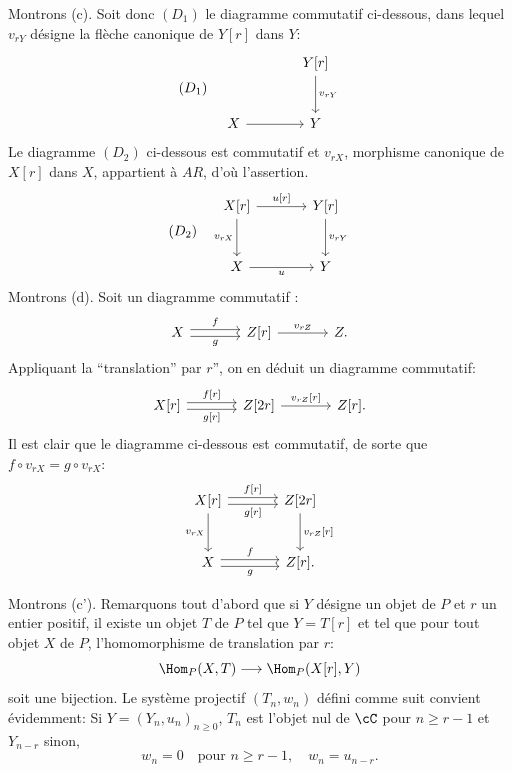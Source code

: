 Montrons (c). Soit donc $(D_1)$ le diagramme commutatif ci-dessous, dans lequel $v_{rY}$ désigne la flèche canonique de $Y[r]$ dans $Y$:
\[
(D_1)\quad
\begin{tikzcd}[column sep=large,row sep=large]
& Y[r] \arrow[d,"{v_{rY}}"]\\
X \arrow[r] & Y
\end{tikzcd}
\]
Le diagramme $(D_2)$ ci-dessous est commutatif et $v_{rX}$, morphisme canonique de $X[r]$ dans $X$, appartient à $AR$, d'où l'assertion.
\[
(D_2)\quad
\begin{tikzcd}[column sep=large,row sep=large]
X[r] \arrow[r,"{u[r]}"] \arrow[d,"{v_{rX}}"'] & Y[r] \arrow[d,"{v_{rY}}"]\\
X \arrow[r,"u"'] & Y
\end{tikzcd}
\]
Montrons (d). Soit un diagramme commutatif :
\[
\begin{tikzcd}[column sep=large]
X \arrow[r,shift left,"f"] \arrow[r,shift right,"g"'] & Z[r] \arrow[r,"{v_{rZ}}"] & Z .
\end{tikzcd}
\]
Appliquant la ``translation'' par $r$'', on en déduit un diagramme commutatif:
\[
\begin{tikzcd}[column sep=large]
X[r] \arrow[r,shift left,"{f[r]}"] \arrow[r,shift right,"{g[r]}"'] & Z[2r] \arrow[r,"{v_{rZ}[r]}"] & Z[r].
\end{tikzcd}
\]
Il est clair que le diagramme ci-dessous est commutatif, de sorte que $f\circ v_{rX}=g\circ v_{rX}$:
\[
\begin{tikzcd}[column sep=large,row sep=large]
X[r] \arrow[r,shift left,"{f[r]}"] \arrow[r,shift right,"{g[r]}"'] \arrow[d,"{v_{rX}}"'] & Z[2r] \arrow[d,"{v_{rZ}[r]}"]\\
X \arrow[r,shift left,"f"] \arrow[r,shift right,"g"'] & Z[r] .
\end{tikzcd}
\]

Montrons (c'). Remarquons tout d'abord que si $Y$ désigne un objet de $P$ et $r$ un entier positif, il existe un objet $T$ de $P$ tel que $Y=T[r]$ et tel que pour tout objet $X$ de $P$, l'homomorphisme de translation par $r$:
\[
\Hom_P(X,T)\longrightarrow\Hom_P(X[r],Y)
\]
soit une bijection. Le système projectif $(T_n,w_n)$ défini comme suit convient évidemment:
Si $Y=(Y_n,u_n)_{n\ge 0}$, $T_n$ est l'objet nul de $\cC$ pour $n\ge r-1$ et $Y_{n-r}$ sinon,
\[
w_n=0\quad\text{pour } n\ge r-1,\quad w_n=u_{n-r}.
\]

